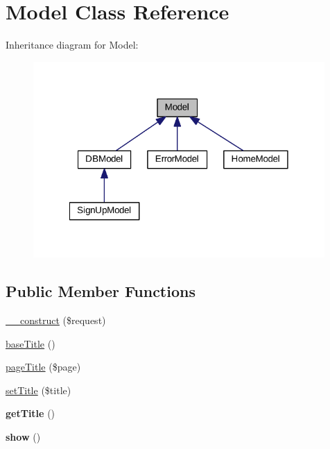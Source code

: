 \hypertarget{classModel}{\section{Model Class Reference}
\label{classModel}
}


Inheritance diagram for Model\+:\nopagebreak
\begin{figure}[H]
\begin{center}
\leavevmode
\includegraphics[width=315pt]{classModel__inherit__graph}
\end{center}
\end{figure}
\subsection*{Public Member Functions}
\begin{DoxyCompactItemize}
\item 
\hyperlink{classModel_a6cdf6d42c65dfc104d7ff60d23550b50}{\+\_\+\+\_\+construct} (\$request)
\item 
\hyperlink{classModel_abd27409e82e2413a8083c22fe73740b9}{base\+Title} ()
\item 
\hyperlink{classModel_a729bceb5699b258da651b948433c0543}{page\+Title} (\$page)
\item 
\hyperlink{classModel_a618dc24391e96f5dabb021f7a91f310c}{set\+Title} (\$title)
\item 
\hypertarget{classModel_a76514c143747205243903e09facf6383}{{\bfseries get\+Title} ()}\label{classModel_a76514c143747205243903e09facf6383}

\item 
\hypertarget{classModel_a0f7d2666269cc8b1b1072c6cbb6ac9e4}{{\bfseries show} ()}\label{classModel_a0f7d2666269cc8b1b1072c6cbb6ac9e4}

\end{DoxyCompactItemize}
